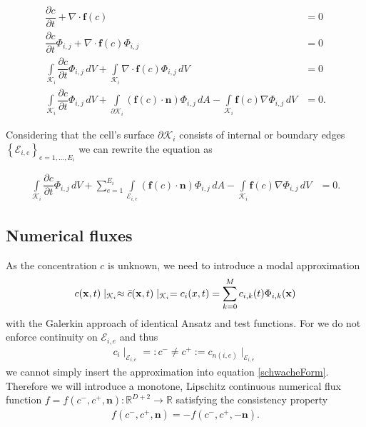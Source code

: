 		\begin{align*}
			\dfrac{\partial c}{\partial t} + \nabla \cdot \boldsymbol{f}(c) &= 0 \\
			\dfrac{\partial c}{\partial t}\Phi_{i,j} + \nabla \cdot \boldsymbol{f}(c)\Phi_{i,j} &= 0 \\
			\int\limits_{\mathcal{K}_i} \dfrac{\partial c}{\partial t}\Phi_{i,j} \, dV + \int\limits_{\mathcal{K}_i}\nabla \cdot \boldsymbol{f}(c)\Phi_{i,j} \, dV &= 0\\
			\int\limits_{\mathcal{K}_i} \dfrac{\partial c}{\partial t}\Phi_{i,j} \, dV +
			\int\limits_{\partial \mathcal{K}_i} \left(\boldsymbol{f} \left( c \right) \cdot \boldsymbol{n} \right)\Phi_{i,j} \, dA
			- \int\limits_{\mathcal{K}_i} \boldsymbol{f}\left(c\right)\nabla\Phi_{i,j} \, dV &= 0.
		\end{align*}
		
		Considering that the cell's surface $\partial \mathcal{K}_i$ consists of internal or boundary edges $\left\{\mathcal{E}_{i,e}\right\}_{e = 1,...,E_i}$ we can rewrite the equation as
		
		\begin{align}
				\int\limits_{\mathcal{K}_i} \dfrac{\partial c}{\partial t}\Phi_{i,j} \, dV +
				\sum_{e=1}^{E_i}\int\limits_{\mathcal{E}_{i,e}} \left(\boldsymbol{f} \left( c \right) \cdot \boldsymbol{n} \right)\Phi_{i,j} \, dA
				- \int\limits_{\mathcal{K}_i} \boldsymbol{f}\left(c\right)\nabla\Phi_{i,j} \, dV &= 0.
				\label{schwacheForm}
		\end{align}
				
		\subsection{Numerical fluxes}
		
		As the concentration $c$ is unknown, we need to introduce a modal approximation
		\begin{align}
			c(\mathbf{x} , t)\mid _{\mathcal{K}_i} \approx \bar{c} (\mathbf{x} , t)\mid _{\mathcal{K}_i} = c_i (\boldmath{x} , t) = \sum_{k = 0}^{M}c_{i,k}(t) \Phi_{i,k}(\mathbf{x})
		\end{align}
		with the Galerkin approach of identical Ansatz and test functions. 
		For we do not enforce continuity on $\mathcal{E}_{i,e}$ and thus 
		\begin{align}
			c_i \mid_{\mathcal{E}_{i,e}}=: c^- \neq c^+ := c_{n(i,e)} \mid_{\mathcal{E}_{i,e}}
		\end{align}
		we cannot simply insert the approximation into equation \eqref{schwacheForm}.
		Therefore we will introduce a monotone, Lipschitz continuous numerical flux function $f = f(c^-, c^+, \mathbf{n}):\mathbb{R}^{D+2}\rightarrow\mathbb{R}$ satisfying the consistency property
		\begin{align}
			f(c^-, c^+, \mathbf{n}) = - f(c^-, c^+, -\mathbf{n}).
		\end{align}
		
